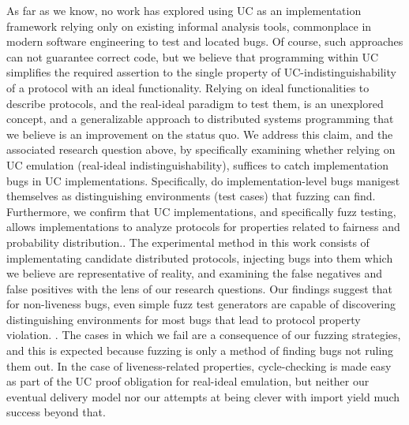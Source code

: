 As far as we know, no work has explored using UC as an implementation framework relying only on existing informal analysis tools, commonplace in modern software engineering to test and located bugs. 
Of course, such approaches can not guarantee correct code, but we believe that programming within UC simplifies the required assertion to the single property of UC-indistinguishability of a protocol with an ideal functionality.
Relying on ideal functionalities to describe protocols, and the real-ideal paradigm to test them, is an unexplored concept, and a generalizable approach to distributed systems programming that we believe is an improvement on the status quo.
We address this claim, and the associated research question above, by specifically examining whether relying on UC emulation (real-ideal indistinguishability), suffices to catch implementation bugs in UC implementations. 
Specifically, do implementation-level bugs manigest themselves as distinguishing environments (test cases) that fuzzing can find.
Furthermore, we confirm that UC implementations, and specifically fuzz testing, allows implementations to analyze protocols for properties related to fairness and probability distribution..
The experimental method in this work consists of implementating candidate distributed protocols, injecting bugs into them which we believe are representative of reality, and examining the false negatives and false positives with the lens of our research questions.
Our findings suggest that for non-liveness bugs, even simple fuzz test generators are capable of discovering distinguishing environments for most bugs that lead to protocol property violation.
.
The cases in which we fail are a consequence of our fuzzing strategies, and this is expected because fuzzing is only a method of finding bugs not ruling them out.
In the case of liveness-related properties, cycle-checking is made easy as part of the UC proof obligation for real-ideal emulation, but neither our eventual delivery model nor our attempts at being clever with import yield much success beyond that. 


